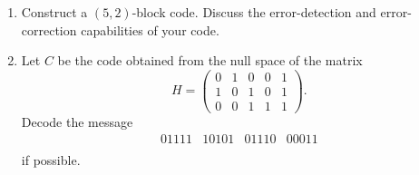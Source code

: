 {\begin{enumerate}
\begin{minipage}[t]{4.6in}
\begin{minipage}[t]{2.25in}
\begin{itemize}
\end{itemize}
\end{minipage}
\end{minipage}
 
\vspace{3pt}        %
\hspace{-7pt}
\begin{minipage}[t]{4.6in}
\noindent
\begin{minipage}[t]{2.25in}
\begin{itemize}
 
 \item[{\bf (c)}]
 
\end{itemize}
\end{minipage} \hfill
\begin{minipage}[t]{2.25in}
\begin{itemize}
 
 \item[{\bf (d)}]
 
\end{itemize}
\end{minipage}
\end{minipage}
 
\vspace{2pt}        %
 
 
 
\bf\item\rm %
Construct a $(5,2)$-block code. Discuss the error-detection and
error-correction capabilities of your code.
 
 
\bf\item\rm
Let $C$ be the code obtained from the null space of the matrix
\[
H =
\left(
\begin{array}{ccccc}
0 & 1 & 0 & 0 & 1 \\
1 & 0 & 1 & 0 & 1 \\
0 & 0 & 1 & 1 & 1
\end{array}
\right).
\]
Decode the message
\[
\begin{array}{cccc}
01111 & 10101 & 01110 & 00011  \\
\end{array}
\]
if possible.
 

\end{enumerate}}
